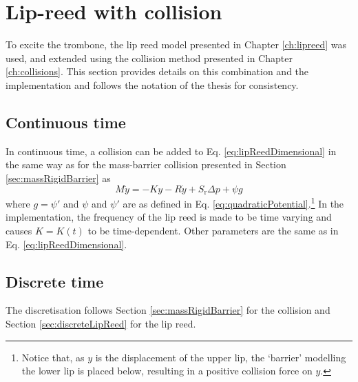 
\section{Lip-reed with collision}\label{sec:lipReedWithCollision}
\def\nph{}
\def\nphSys{n+1/2}
To excite the trombone, the lip reed model presented in Chapter \ref{ch:lipreed} was used, and extended using the collision method presented in Chapter \ref{ch:collisions}. This section provides details on this combination and the implementation and follows the notation of the thesis for consistency.

\subsection{Continuous time}
In continuous time, a collision can be added to Eq. \eqref{eq:lipReedDimensional} in the same way as for the mass-barrier collision presented in Section \ref{sec:massRigidBarrier} as
\begin{equation}\label{eq:lipWithCollisionCont}
    M\ddot y = -K y - R \dot y + S_\text{r}\Delta p + \psi g
\end{equation}
where $g = \psi'$ and $\psi$ and $\psi'$ are as defined in Eq. \eqref{eq:quadraticPotential}.\footnote{Notice that, as $y$ is the displacement of the upper lip, the `barrier' modelling the lower lip is placed below, resulting in a positive collision force on $y$.} In the implementation, the frequency of the lip reed is made to be time varying and causes $K = K(t)$ to be time-dependent. Other parameters are the same as in Eq. \eqref{eq:lipReedDimensional}.

\subsection{Discrete time}
The discretisation follows Section \ref{sec:massRigidBarrier} for the collision and Section \ref{sec:discreteLipReed} for the lip reed.

